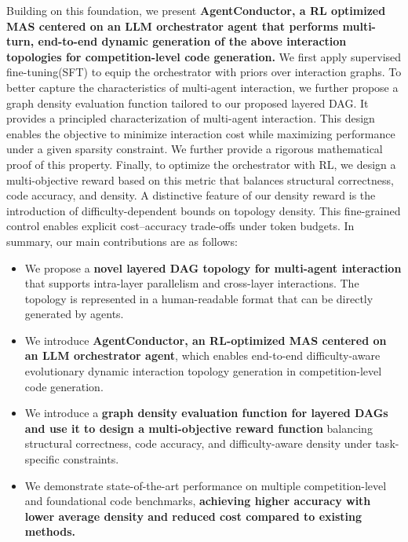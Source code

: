 \documentclass{article}
\theoremstyle{definition}
\begin{document}
Building on this foundation, we present \textbf{AgentConductor, a RL optimized MAS centered on an LLM orchestrator agent that performs multi-turn, end-to-end dynamic generation of the above interaction topologies for competition-level code generation.} We first apply supervised fine-tuning(SFT) to equip the orchestrator with priors over interaction graphs. To better capture the characteristics of multi-agent interaction, we further propose a graph density evaluation function tailored to our proposed layered DAG. It provides a principled characterization of multi-agent interaction. This design enables the objective to minimize interaction cost while maximizing performance under a given sparsity constraint. We further provide a rigorous mathematical proof of this property. Finally, to optimize the orchestrator with RL, we design a multi-objective reward based on this metric that balances structural correctness, code accuracy, and density. A distinctive feature of our density reward is the introduction of difficulty-dependent bounds on topology density. This fine-grained control enables explicit cost–accuracy trade-offs under token budgets. In summary, our main contributions are as follows:
\begin{itemize} 

\item We propose a \textbf{novel layered DAG topology for multi-agent interaction} that supports intra-layer parallelism and cross-layer interactions. The topology is represented in a human-readable format that can be directly generated by agents.

\item We introduce \textbf{AgentConductor, an RL-optimized MAS centered on an LLM orchestrator agent}, which enables end-to-end difficulty-aware evolutionary dynamic interaction topology generation in competition-level code generation.

\item We introduce a \textbf{graph density evaluation function for layered DAGs and use it to design a multi-objective reward function} balancing structural correctness, code accuracy, and difficulty-aware density under task-specific constraints.

\item We demonstrate state-of-the-art performance on multiple competition-level and foundational code benchmarks, \textbf{achieving higher accuracy with lower average density and reduced cost compared to existing methods.}
\end{itemize}
\end{document}
